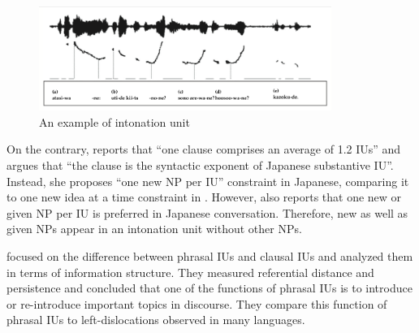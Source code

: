 \begin{figure}
 \centering
 \includegraphics[width=0.85\textwidth]{sounds/iwasaki_IU.png}
 \caption{An example of intonation unit \cite[109]{iwasaki08}}
 \label{IUExF}
\end{figure}


On the contrary,  reports that
``one clause comprises an average of 1.2 IUs''
and argues that
``the clause is the syntactic exponent of Japanese substantive IU''.
Instead, she proposes ``one new NP per IU'' constraint in Japanese,
comparing it to one new idea at a time constraint in .
However,  also reports that
one new or given NP per IU is preferred in Japanese conversation.
Therefore,
new as well as given NPs appear in an intonation unit
without other NPs.




 focused on the difference between
phrasal IUs and clausal IUs and
analyzed them in terms of information structure.
They measured referential distance and persistence \cite{givon83} and concluded that
one of the functions of phrasal IUs is to introduce or re-introduce
important topics in discourse.
They compare this function of phrasal IUs to left-dislocations observed in many languages.

%



